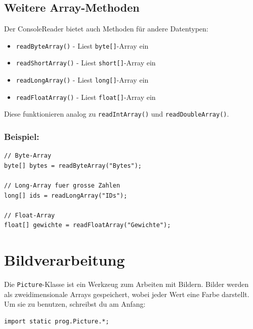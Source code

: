 \newpage


\subsection*{Weitere Array-Methoden}

Der ConsoleReader bietet auch Methoden für andere Datentypen:

\begin{itemize}
	\item \texttt{readByteArray()} - Liest \texttt{byte[]}-Array ein
	\item \texttt{readShortArray()} - Liest \texttt{short[]}-Array ein
	\item \texttt{readLongArray()} - Liest \texttt{long[]}-Array ein
	\item \texttt{readFloatArray()} - Liest \texttt{float[]}-Array ein
\end{itemize}

Diese funktionieren analog zu \texttt{readIntArray()} und \texttt{readDoubleArray()}.

\subsubsection*{Beispiel:}
\begin{lstlisting}
// Byte-Array
byte[] bytes = readByteArray("Bytes");

// Long-Array fuer grosse Zahlen
long[] ids = readLongArray("IDs");

// Float-Array
float[] gewichte = readFloatArray("Gewichte");
\end{lstlisting}

\newpage


\section*{Bildverarbeitung}

Die \texttt{Picture}-Klasse ist ein Werkzeug zum Arbeiten mit Bildern.
Bilder werden als zweidimensionale Arrays gespeichert, wobei jeder Wert eine Farbe darstellt.
Um sie zu benutzen, schreibst du am Anfang:

\begin{lstlisting}
import static prog.Picture.*;
\end{lstlisting}

